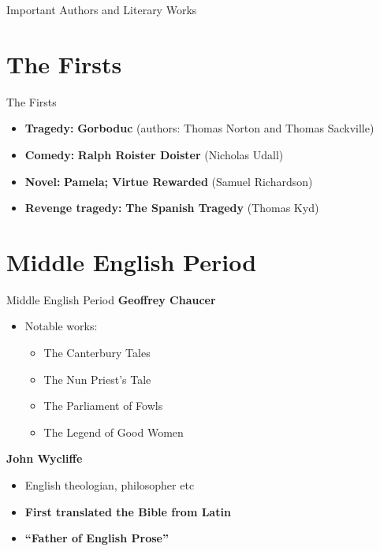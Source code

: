 \documentclass[
  12pt,
    progressbar=frametitle]{beamer}
\providecommand{\tightlist}{%
  \setlength{\itemsep}{0pt}\setlength{\parskip}{0pt}}
\begin{document}
\newcommand{\outstandingmove}[1]{
\definecolor{springgreen}{RGB}{0, 255, 127}
{
\begin{frame}[standout]
 #1
\end{frame}
}}

\outstandingmove{Important Authors and Literary Works}


\section{The Firsts}
\begin{frame}[allowframebreaks]
{The Firsts}
\begin{itemize}
\tightlist
\item
  \textbf{Tragedy:} \textbf{Gorboduc} (authors: Thomas Norton and Thomas
  Sackville)
\item
  \textbf{Comedy:} \textbf{Ralph Roister Doister} (Nicholas Udall)
\item
  \textbf{Novel:} \textbf{Pamela; Virtue Rewarded} (Samuel Richardson)
\item
  \textbf{Revenge tragedy:} \textbf{The Spanish Tragedy} (Thomas Kyd)
\end{itemize}
\end{frame}

\section{Middle English Period}
\begin{frame}[allowframebreaks]
{Middle English Period}
\large\textbf{Geoffrey Chaucer}\normalsize\vspace{-3mm}

\begin{itemize}
\tightlist
\item
  Notable works:

  \begin{itemize}
  \tightlist
  \item
    The Canterbury Tales
  \item
    The Nun Priest's Tale
  \item
    The Parliament of Fowls
  \item
    The Legend of Good Women
  \end{itemize}
\end{itemize}

\large\textbf{John Wycliffe}\normalsize\vspace{-3mm}

\begin{itemize}
\tightlist
\item
  English theologian, philosopher etc
\item
  \textbf{First translated the Bible from Latin}
\item
  \textbf{``Father of English Prose''}
\end{itemize}
\end{frame}
\end{document}
